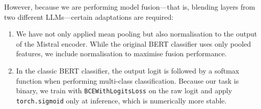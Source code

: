 \documentclass[12pt]{article}
\begin{document}
However, because we are performing model fusion\;---\;that is, blending layers from two different LLMs\;---\;certain adaptations are required:

\begin{enumerate}
  \item We have not only applied mean pooling but also normalisation to the output of the Mistral encoder. 
  While the original BERT classifier uses only pooled features, we include normalisation to maximise fusion performance.
  \item In the classic BERT classifier, the output logit is followed by a softmax function when performing multi-class classification. 
  Because our task is binary, we train with \texttt{BCEWithLogitsLoss} on the raw logit and apply \texttt{torch.sigmoid} only at inference, which is numerically more stable.
\end{enumerate}
\end{document}
